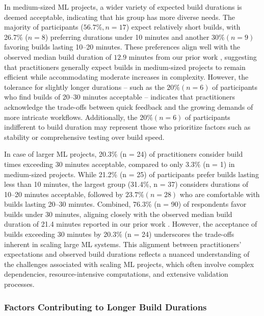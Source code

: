 In medium-sized ML projects, a wider variety of expected build durations is deemed acceptable, indicating that his group has more diverse needs. The majority of participants ($56.7\%, n = 17$) expect relatively short builds, with 26.7\% ($n = 8$) preferring durations under 10 minutes and another $30\% (n = 9)$ favoring builds lasting 10–20 minutes. These preferences align well with the observed median build duration of $12.9$ minutes from our prior work \citep{bernardo2024machine}, suggesting that practitioners generally expect builds in medium-sized projects to remain efficient while accommodating moderate increases in complexity. However, the tolerance for slightly longer durations -- such as the $20\% (n = 6)$ of participants who find builds of 20–30 minutes acceptable -- indicates that practitioners acknowledge the trade-offs between quick feedback and the growing demands of more intricate workflows. Additionally, the $20\% (n = 6)$ of participants indifferent to build duration may represent those who prioritize factors such as stability or comprehensive testing over build speed.


In case of larger ML projects, 20.3\% (n = 24) of practitioners consider build times exceeding 30 minutes acceptable, compared
to only 3.3\% (n = 1) in medium-sized projects.
While 21.2\% (n = 25) of participants prefer builds lasting less than 10 minutes, the largest group (31.4\%, n = 37) considers durations of 10–20 minutes acceptable, followed by $23.7\% (n = 28)$ who are comfortable with builds lasting 20–30 minutes. Combined, 76.3\% (n = 90) of respondents favor builds under 30 minutes, aligning closely with the observed median build duration of 21.4 minutes reported in our prior work \citep{bernardo2024machine}.
However, the acceptance of builds exceeding 30 minutes by 20.3\% (n = 24) underscores the trade-offs inherent in scaling large ML systems. This alignment between practitioners’ expectations and observed build durations reflects a nuanced understanding of the challenges associated with scaling ML projects, which often involve complex dependencies, resource-intensive computations, and extensive validation processes. 

\subsubsection*{\textbf{Factors Contributing to Longer Build Durations}}

